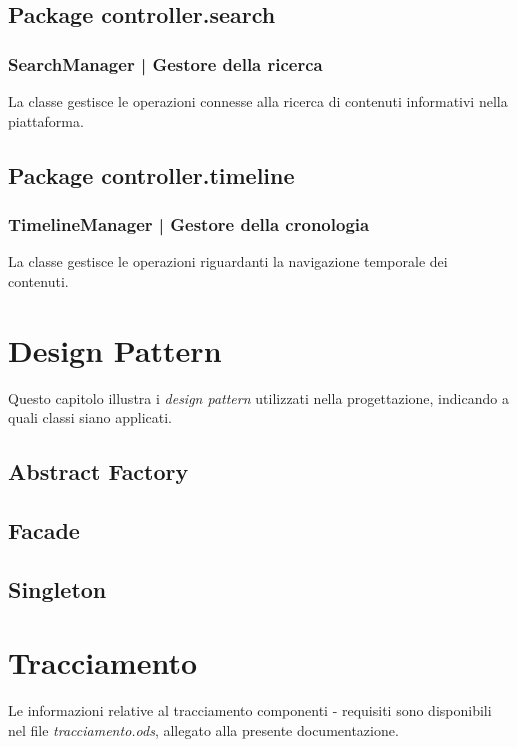 \documentclass[10pt,a4paper,headinclude,footinclude,hidelinks]{scrreprt} %
\begin{document}
	\section{Package controller.search}
	\label{sec:stage:design:controller.search}

	\subsection[SearchManager]{SearchManager | Gestore della ricerca}
	\label{sec:stage:design:controller:search-manager}
	La classe \textit{} gestisce le operazioni connesse alla ricerca di contenuti informativi nella piattaforma.	

	\section{Package controller.timeline}
	\label{sec:stage:design:controller.timeline}

	\subsection[TimelineManager]{TimelineManager | Gestore della cronologia}
	\label{sec:stage:design:controller:timeline-manager}
	La classe \textit{} gestisce le operazioni riguardanti la navigazione temporale dei contenuti.

	\chapter{Design Pattern}
	\label{ch:stage:design:pattern}
	Questo capitolo illustra i \textit{design pattern} utilizzati nella progettazione, indicando a quali classi siano applicati.

	\section{Abstract Factory}
	\label{sec:stage:design:pattern:factory}

	\section{Facade}
	\label{sec:stage:design:pattern:facade}

	\section{Singleton}
	\label{sec:stage:design:pattern:singleton}

	\chapter{Tracciamento}
	\label{ch:stage:design:tracciamento}
	Le informazioni relative al tracciamento componenti - requisiti sono disponibili nel file \textit{tracciamento.ods}, allegato alla presente documentazione.
\end{document}
